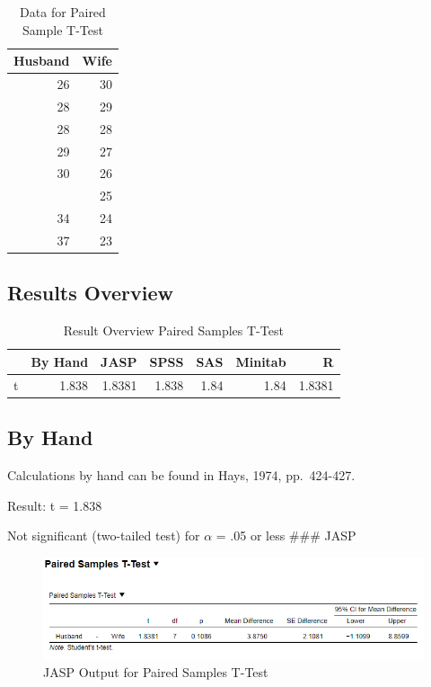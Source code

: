 \documentclass[
]{book}
\begin{document}
\begin{table}

\caption{\label{tab:unnamed-chunk-21}Data for Paired Sample T-Test}
\centering
\begin{tabular}[t]{rr}
\toprule
Husband & Wife\\
\midrule
26 & 30\\
28 & 29\\
28 & 28\\
29 & 27\\
30 & 26\\
\addlinespace
31 & 25\\
34 & 24\\
37 & 23\\
\bottomrule
\end{tabular}
\end{table}

\hypertarget{results-overview-2}{%
\subsection{Results Overview}\label{results-overview-2}}

\begin{table}

\caption{\label{tab:unnamed-chunk-22}Result Overview Paired Samples T-Test}
\centering
\begin{tabular}[t]{lrrrrrr}
\toprule
  & By Hand & JASP & SPSS & SAS & Minitab & R\\
\midrule
t & 1.838 & 1.8381 & 1.838 & 1.84 & 1.84 & 1.8381\\
\bottomrule
\end{tabular}
\end{table}

\hypertarget{by-hand-2}{%
\subsection{By Hand}\label{by-hand-2}}

Calculations by hand can be found in Hays, 1974, pp.~424-427.

Result: t = 1.838

Not significant (two-tailed test) for \(\alpha\) = .05 or less
\#\#\# JASP

\begin{figure}[!h]
\includegraphics{Screenshots/Paired Samples T test/psttJASP} \caption{\label{fig:psttJASP}JASP Output for Paired Samples T-Test}\label{fig:psttJASP}
\end{figure}
\end{document}
